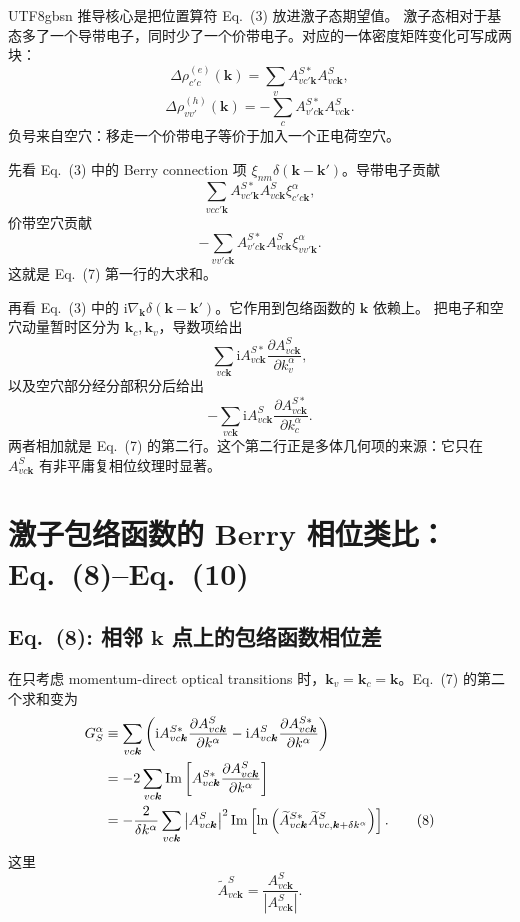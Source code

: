 \documentclass[11pt,a4paper]{article}
\newcommand{\ii}{\mathrm{i}}
\newcommand{\Impart}{\operatorname{Im}}
\begin{document}
\begin{CJK}{UTF8}{gbsn}
推导核心是把位置算符 Eq.~(3) 放进激子态期望值。
激子态相对于基态多了一个导带电子，同时少了一个价带电子。对应的一体密度矩阵变化可写成两块：
\[
\Delta\rho^{(e)}_{c'c}(\bm k)
=\sum_v A^{S*}_{vc'\bm k}A^S_{vc\bm k},
\]
\[
\Delta\rho^{(h)}_{vv'}(\bm k)
=-\sum_c A^{S*}_{v'c\bm k}A^S_{vc\bm k}.
\]
负号来自空穴：移走一个价带电子等价于加入一个正电荷空穴。

先看 Eq.~(3) 中的 Berry connection 项
$\xi_{nm}\delta(\bm k-\bm k')$。导带电子贡献
\[
\sum_{vcc'\bm k}
A^{S*}_{vc'\bm k}A^S_{vc\bm k}
\xi^\alpha_{c'c\bm k},
\]
价带空穴贡献
\[
-\sum_{vv'c\bm k}
A^{S*}_{v'c\bm k}A^S_{vc\bm k}
\xi^\alpha_{vv'\bm k}.
\]
这就是 Eq.~(7) 第一行的大求和。

再看 Eq.~(3) 中的
$\ii\nabla_{\bm k}\delta(\bm k-\bm k')$。它作用到包络函数的 $\bm k$ 依赖上。
把电子和空穴动量暂时区分为 $\bm k_c,\bm k_v$，导数项给出
\[
\sum_{vc\bm k}
\ii A^{S*}_{vc\bm k}
\frac{\partial A^S_{vc\bm k}}{\partial k^\alpha_v},
\]
以及空穴部分经分部积分后给出
\[
-\sum_{vc\bm k}
\ii A^S_{vc\bm k}
\frac{\partial A^{S*}_{vc\bm k}}{\partial k^\alpha_c}.
\]
两者相加就是 Eq.~(7) 的第二行。这个第二行正是多体几何项的来源：它只在
$A^S_{vc\bm k}$ 有非平庸复相位纹理时显著。

\section{激子包络函数的 Berry 相位类比：Eq.~(8)--Eq.~(10)}

\subsection*{Eq.~(8): 相邻 $\bm k$ 点上的包络函数相位差}

在只考虑 momentum-direct optical transitions 时，$\bm k_v=\bm k_c=\bm k$。Eq.~(7) 的第二个求和变为
\begin{align}
G^\alpha_S
&\equiv
\sum_{vc\bm k}
\left(
\ii A^{S*}_{vc\bm k}
\frac{\partial A^S_{vc\bm k}}{\partial k^\alpha}
-\ii A^S_{vc\bm k}
\frac{\partial A^{S*}_{vc\bm k}}{\partial k^\alpha}
\right)
\notag\\
&=
-2\sum_{vc\bm k}
\Impart\left[
A^{S*}_{vc\bm k}
\frac{\partial A^S_{vc\bm k}}{\partial k^\alpha}
\right]
\notag\\
&=
-\frac{2}{\delta k^\alpha}
\sum_{vc\bm k}
\left|A^S_{vc\bm k}\right|^2
\Impart\left[
\ln\left(
\widetilde A^{S*}_{vc\bm k}
\widetilde A^S_{vc,\bm k+\delta k^\alpha}
\right)
\right].
\tag{8}
\end{align}
这里
\[
\widetilde A^S_{vc\bm k}
=\frac{A^S_{vc\bm k}}{|A^S_{vc\bm k}|}.
\]


\end{CJK}
\end{document}
